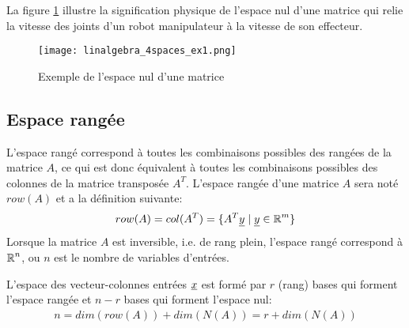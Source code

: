 \newpage
\begin{example}
La figure \ref{fig:4spaces_ex1} illustre la signification physique de l'espace nul d'une matrice qui relie la vitesse des joints d'un robot manipulateur à la vitesse de son effecteur.
\begin{figure}[H]
	\centering
		\texttt{[image: linalgebra\_4spaces\_ex1.png]}
	\caption{Exemple de l'espace nul d'une matrice}
	\label{fig:4spaces_ex1}
\end{figure}
\end{example}


\subsection{Espace rangée}
\label{sec:esprow}

L'espace rangé correspond à toutes les combinaisons possibles des rangées de la matrice $A$, ce qui est donc équivalent à toutes les combinaisons possibles des colonnes de la matrice transposée $A^T$. L'espace rangée d'une matrice $A$ sera noté $row(A)$ et a la définition suivante:
\begin{align}
row(A) =  col(A^T) = 
\{ A^T \underline{y} \; | \; \underline{y} \in \operatorname{\mathbb{R}}^m \}
\end{align}
Lorsque la matrice $A$ est inversible, i.e. de rang plein, l'espace rangé correspond à $\operatorname{\mathbb{R}}^n$, ou $n$ est le nombre de variables d'entrées.


L'espace des vecteur-colonnes entrées $\underline{x}$ est formé par $r$ (rang) bases qui forment l'espace rangée et $n-r$ bases qui forment l'espace nul:
\begin{align}
n     = dim( row(A) ) + dim( N(A) )  = r + dim( N(A) )
\end{align}

